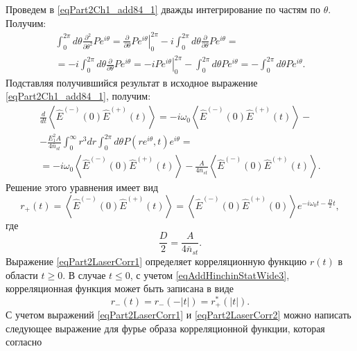 Проведем в \eqref{eqPart2Ch1_add84_1} дважды интегрирование по частям
по $\theta$. Получим:
\begin{eqnarray}
\int_0^{2 \pi}
d \theta
\frac{\partial^2}{\partial \theta^2}P e^{i \theta} = 
\left.\frac{\partial}{\partial \theta}P e^{i \theta}\right|_0^{2 \pi}
- 
i \int_0^{2 \pi}
d \theta
\frac{\partial}{\partial \theta}P e^{i \theta} = 
\nonumber \\
= - i \int_0^{2 \pi}
d \theta
\frac{\partial}{\partial \theta}P e^{i \theta}  
= 
- i \left.P e^{i \theta}\right|_0^{2 \pi}
-
\int_0^{2 \pi}
d \theta
P e^{i \theta} = 
- \int_0^{2 \pi}
d \theta
P e^{i \theta}.
\nonumber
\end{eqnarray}
Подставляя получившийся результат в исходное выражение
\eqref{eqPart2Ch1_add84_1}, получим:
\begin{eqnarray}
\frac{d}{dt}\left<\hat{E}^{(-)}\left(0\right)\hat{E}^{(+)}\left(t\right)\right>
=
-i \omega_0
\left<\hat{E}^{(-)}\left(0\right)\hat{E}^{(+)}\left(t\right)\right>-
\nonumber \\
-
\frac{E_1^2 A}{4 \bar{n}_{st}} 
\int_0^{\infty}r^3 d r 
\int_0^{2 \pi}
d \theta
P\left(r
e^{i \theta}, t\right) e^{i \theta} = 
\nonumber \\
=-i \omega_0
\left<\hat{E}^{(-)}\left(0\right)\hat{E}^{(+)}\left(t\right)\right> -
\frac{A}{4 \bar{n}_{st}}\left<\hat{E}^{(-)}\left(0\right)\hat{E}^{(+)}\left(t\right)\right>.
\nonumber
\end{eqnarray}
Решение этого уравнения имеет вид
\begin{equation}
r_{+}\left(t\right) = \left<\hat{E}^{(-)}\left(0\right)\hat{E}^{(+)}\left(t\right)\right> =
\left<\hat{E}^{(-)}\left(0\right)\hat{E}^{(+)}\left(0\right)\right>
e^{-i \omega_0 t - \frac{D}{2}t},
\label{eqPart2LaserCorr1}
\end{equation}
где
\[
\frac{D}{2} = \frac{A}{4 \bar{n}_{st}}.
\]
Выражение \eqref{eqPart2LaserCorr1} определяет корреляционную функцию
$r\left(t\right)$ в области $t \ge 0$. В случае $t \le 0$, с учетом
\eqref{eqAddHinchinStatWide3}, корреляционная функция может быть
записана в виде  
\begin{equation}
r_{-}\left(t\right) = r_{-}\left(-\left|t\right|\right) =
r_{+}^{*}\left(\left|t\right|\right). 
\label{eqPart2LaserCorr2}
\end{equation}
С учетом выражений \eqref{eqPart2LaserCorr1} и
\eqref{eqPart2LaserCorr2} можно написать следующее выражение для фурье
образа корреляционной функции, которая согласно 

